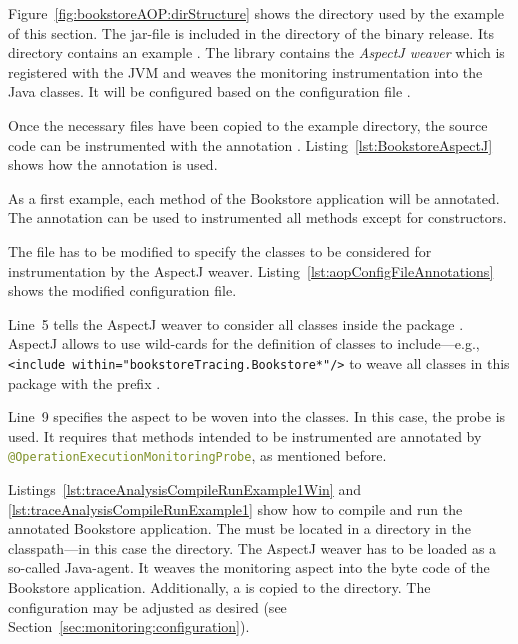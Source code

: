 Figure~\ref{fig:bookstoreAOP:dirStructure} shows the directory used by the example of this section. The jar-file  is included in the  directory of the \Kieker{} binary release. Its  directory contains an example \file{\aopConfigFile}. The library  contains the \textit{AspectJ weaver} which is registered with the JVM and weaves the monitoring instrumentation into the Java classes. It will be configured based on the configuration file \file{\file{\aopConfigFile}}.

Once the necessary files have been copied to the example directory, the source code can be instrumented with the annotation 
. Listing~\ref{lst:BookstoreAspectJ} shows how the annotation is used.

\setJavaCodeListing


\noindent As a first example, each method of the Bookstore application will be annotated. The annotation can be used to instrumented all methods except for constructors. 

The \file{\aopConfigFile} file has to be modified to specify the classes to be considered for instrumentation by the AspectJ weaver. Listing~\ref{lst:aopConfigFileAnnotations} shows the modified configuration file.

\setXMLListing


\noindent Line~5 tells the AspectJ weaver to consider all classes inside the package %
. AspectJ allows to use wild-cards for the definition of classes to %
include---e.g., \lstinline$<include within="bookstoreTracing.Bookstore*"/>$ to weave all %
classes in this package with the prefix . 

Line~9 specifies the aspect to be woven into the classes. In this case, the \Kieker{} %
probe  is used. It requires that %
methods intended to be instrumented are annotated by %
\lstinline[language=Java]{@OperationExecutionMonitoringProbe}, as mentioned before. 

Listings~\ref{lst:traceAnalysisCompileRunExample1Win} and %
\ref{lst:traceAnalysisCompileRunExample1} show how to compile and run the annotated %
Bookstore application. The \file{\aopConfigFile} must be located in a %
 directory in the classpath---in this case the  directory. %
The AspectJ weaver has to be loaded as a so-called Java-agent. It weaves the %
monitoring aspect into the byte code of the Bookstore application. %
Additionally, a \file{\kiekerMonitoringProperties{}} is copied to the  directory. %
The configuration may be adjusted as desired (see Section~\ref{sec:monitoring:configuration}).

